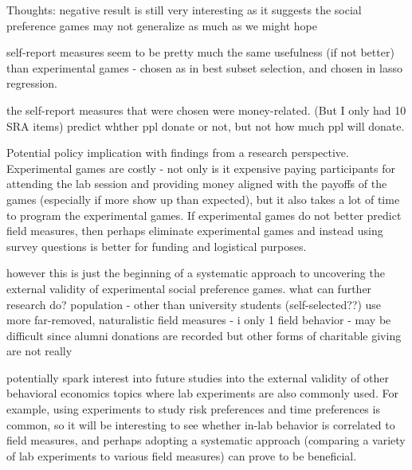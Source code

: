 \documentclass[12pt]{article}
\begin{document}
Thoughts:
negative result is still very interesting as it suggests the social preference games may not generalize as much as we might hope

self-report measures seem to be pretty much the same usefulness (if not better) than experimental games - chosen as in best subset selection, and chosen in lasso regression.

the self-report measures that were chosen were money-related. (But I only had 10 SRA items)
predict whther ppl donate or not, but not how much ppl will donate.

Potential policy implication with findings from a research perspective. Experimental games are costly - not only is it expensive paying participants for attending the lab session and providing money aligned with the payoffs of the games (especially if more show up than expected), but it also takes a lot of time to program the experimental games. If experimental games do not better predict field measures, then perhaps eliminate experimental games and instead using survey questions is better for funding and logistical purposes. 

however this is just the beginning of a systematic approach to uncovering the external validity of experimental social preference games. what can further research do?
population - other than university students (self-selected??)
use more far-removed, naturalistic field measures - i only 1 field behavior - may be difficult since alumni donations are recorded but other forms of charitable giving are not really

potentially spark interest into future studies into the external validity of other behavioral economics topics where lab experiments are also commonly used. For example, using experiments to study risk preferences and time preferences is common, so it will be interesting to see whether in-lab behavior is correlated to field measures, and perhaps adopting a systematic approach (comparing a variety of lab experiments to various field measures) can prove to be beneficial.
\end{document}
